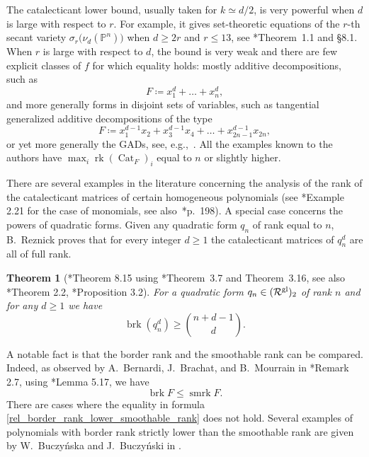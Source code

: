\documentclass[a4paper,11pt,reqno]{amsart}
\newcommand{\calR}{\mathcal{R}}
\newcommand{\bbP}{\mathbb{P}}
\DeclareMathOperator{\brk}{brk}
\DeclareMathOperator{\Cat}{Cat}
\DeclareMathOperator{\rk}{rk}
\DeclareMathOperator{\smrk}{smrk}
\numberwithin{equation}{section}
\theoremstyle{definition}
\theoremstyle{plain}
\newtheorem{teo}[defn]{Theorem}
\theoremstyle{remark}
\newcommand{\calRgl}{\calR^{\rm{gl}}}
\begin{document}
The catalecticant {lower} bound, usually taken for $k\simeq d/2$, is very
{powerful} when $d$ is large with respect to $r$. For example, it gives
{set-theoretic}
equations of the $r$-th secant variety $\sigma_{r}\bigl( \nu_d(\bbP^n) \bigr)$ when $d\geq 2r$ and
$r\leq 13$, see \cite{BB14}*{Theorem~1.1 and \S8.1}.
When $r$ is large with respect to $d$, the bound is very weak
and there are few explicit classes of $f$ for which equality holds: mostly
additive decompositions, such as \[ {F}\coloneqq  x_1^d +  \ldots + x_n^d, \] and more generally forms in
disjoint sets of variables, such as tangential generalized additive
decompositions of the type \[ {F}\coloneqq  x_1^{d-1}x_{2} + x_{3}^{d-1}x_4 +  \ldots +
x_{2n-1}^{d-1}x_{2n},\]
or yet more generally the GADs, see, e.g.,~\cite{BOT23}. {All the examples known to the authors} have $\max_i\rk (\Cat_{{F}})_{i}$ equal to $n$ or slightly
higher.

There are several examples in the literature concerning the analysis of the
rank of the catalecticant matrices of certain homogeneous
polynomials (see \cite{BBM14}*{Example 2.21} for the case of monomials, see
also~\cite{IK99}*{p.~198}). A
special case concerns the powers of quadratic forms. Given any quadratic form
$q_n$ of rank equal to $n$, B.~Reznick proves that
for every integer $d\geq 1$ the catalecticant matrices of $q_n^d$ are all {of} full rank.
\begin{teo}[{\cite{Rez92}*{Theorem 8.15} using \cite{Rez92}*{Theorem~3.7 and Theorem~3.16}, see also \cite{GL19}*{Theorem 2.2}, \cite{Fla23}*{Proposition 3.2}}]
\label{teo:lower_bound_border_rank_q_n^d}
For a quadratic form $q_n\in(\calRgl)_2$ of rank $n$ and for any $d\geq 1$ we have
\[
\brk(q_n^d)\geq\binom{n+d-1}{d}.
\]
\end{teo}

A notable fact is that the border rank and the smoothable rank can be compared. Indeed, as observed by A.~Bernardi, J.~Brachat, and B.~Mourrain in \cite{BBM14}*{Remark 2.7}, using \cite{IK99}*{Lemma 5.17}, we have
\begin{equation}
\label{rel_border_rank_lower_smoothable_rank}
\brk {F}\leq \smrk {F}.
\end{equation}
There are cases where the equality in formula
\eqref{rel_border_rank_lower_smoothable_rank} does not hold. Several examples
of polynomials with border rank strictly {lower} than the smoothable rank are
given by W.~Buczy\'{n}ska and J.~Buczy\'{n}ski in \cite{BB15}.
\end{document}
